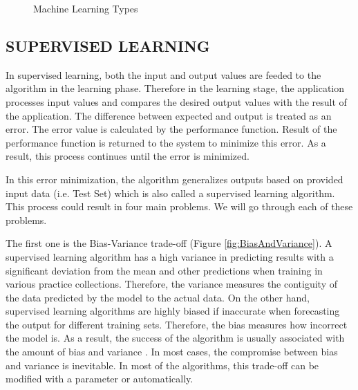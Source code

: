 \begin{figure}[htbp]
\centering
{}
\caption{Machine Learning Types}
\label{fig:MachineLearningTypes}
\end{figure}

\subsection{SUPERVISED LEARNING}

In supervised learning, both the input and output values are feeded to the algorithm in the learning phase. Therefore in the learning stage, the application processes input values and compares the desired output values with the result of the application. The difference between expected and output is treated as an error. The error value is calculated by the performance function. Result of the performance function is returned to the system to minimize this error. As a result, this process continues until the error is minimized.

In this error minimization, the algorithm generalizes outputs based on provided input data (i.e. Test Set) which is also called a supervised learning algorithm. This process could result in four main problems. We will go through each of these problems. 

The first one is the Bias-Variance trade-off \cite{geman1992neural} (Figure \ref{fig:BiasAndVariance}). A supervised learning algorithm has a high variance in predicting results with a significant deviation from the mean and other predictions when training in various practice collections. Therefore, the variance measures the contiguity of the data predicted by the model to the actual data. On the other hand, supervised learning algorithms are highly biased if inaccurate when forecasting the output for different training sets. Therefore, the bias measures how incorrect the model is. As a result, the success of the algorithm is usually associated with the amount of bias and variance \cite{james2003variance}. In most cases, the compromise between bias and variance is inevitable. In most of the algorithms, this trade-off can be modified with a parameter or automatically. 

